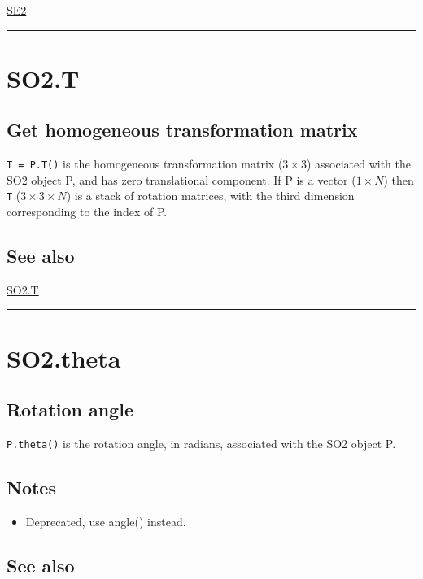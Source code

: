 \hyperlink{SE2}{\color{blue} SE2}

\vspace{1.5ex}\hrule

\hypertarget{SO2.T}{\section*{SO2.T}}
\subsection*{Get homogeneous transformation matrix}


\texttt{T = P.T()} is the homogeneous transformation matrix ($3 \times 3$) associated with the
SO2 object P, and has zero translational component.  If P is a vector
($1 \times N$) then \texttt{T} ($3 \times 3 \times N$) is a stack of rotation matrices, with the third
dimension corresponding to the index of P.


\subsection*{See also}


\hyperlink{SO2.T}{\color{blue} SO2.T}

\vspace{1.5ex}\hrule

\hypertarget{SO2.theta}{\section*{SO2.theta}}
\subsection*{Rotation angle}


\texttt{P.theta()} is the rotation angle, in radians, associated with the
SO2 object P.


\subsection*{Notes}
\begin{itemize}
  \item Deprecated, use angle() instead.
\end{itemize}

\subsection*{See also}


